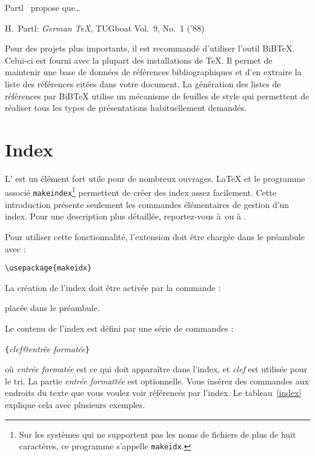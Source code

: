 \begin{example}
Partl~\cite{pa}
propose que\dots

{\small
\begin{thebibliography}{99}
 H.~Partl:
\emph{German \TeX},
TUGboat Vol.~9, No.~1 ('88)
\end{thebibliography}
}
\end{example}
\thispagestyle{fancyplain}


Pour des projets plus importants, il est recommandé d'utiliser l'outil
BiB\TeX{}. Celui-ci est fourni avec la plupart des installations de
\TeX{}. Il permet de maintenir une base de données de références
bibliographiques et d'en extraire la liste des références citées dans
votre document. La génération des listes de références  par
BiB\TeX{} utilise un mécanisme de feuilles de style qui permettent
de réaliser tous les types de présentations habituellement demandés.

\section{Index} \label{sec:indexing}
L' est un élément fort utile pour de nombreux
ouvrages. \LaTeX{} et le programme associé
\texttt{makeindex}\footnote{Sur les systèmes qui ne supportent pas les
noms de fichiers de plus de huit caractères, ce programme s'appelle
\texttt{makeidx}.} permettent de créer des index assez
facilement. Cette introduction présente seulement les commandes
élémentaires de gestion d'un index. Pour une description plus
détaillée, reportez-vous à~\companion ou à \desgraupes{}.

Pour utiliser cette fonctionnalité, l'extension  doit être
chargée dans le préambule avec :
\begin{lscommand}
\verb|\usepackage{makeidx}|
\end{lscommand}
\pagebreak[3]
La  création de l'index doit être activée par la commande :
\begin{lscommand}
\end{lscommand}
\noindent placée dans le préambule.

Le contenu de l'index est défini par une série de commandes :
\begin{lscommand}
  \verb|{|\emph{clef@entrée formatée}\verb|}|
\end{lscommand}
\noindent
où \emph{entrée formatée} est ce qui doit apparaître dans l'index, et
\emph{clef} est utilisée pour le tri. La partie \emph{entrée formattée} est
optionnelle. Vous insérez des commandes
  aux endroits du texte que vous voulez voir référencés par
 l'index. Le tableau~\ref{index} explique cela
 avec plusieurs exemples.

